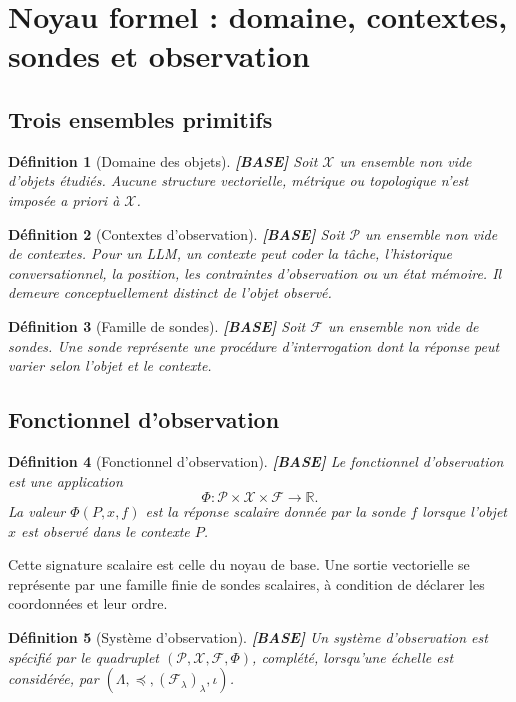 \documentclass[11pt,a4paper]{article}
\newtheorem{definition}{Définition}[section]
\theoremstyle{remark}
\newcommand{\R}{\mathbb R}
\newcommand{\X}{\mathcal X}
\newcommand{\Pctx}{\mathcal P}
\newcommand{\F}{\mathcal F}
\newcommand{\Lam}{\Lambda}
\begin{document}
\section{Noyau formel : domaine, contextes, sondes et observation}

\subsection{Trois ensembles primitifs}
\begin{definition}[Domaine des objets] \textbf{[BASE]}
Soit $\X$ un ensemble non vide d'objets étudiés. Aucune structure vectorielle, métrique ou topologique n'est imposée a priori à $\X$.
\end{definition}

\begin{definition}[Contextes d'observation] \textbf{[BASE]}
Soit $\Pctx$ un ensemble non vide de contextes. Pour un LLM, un contexte peut coder la tâche, l'historique conversationnel, la position, les contraintes d'observation ou un état mémoire. Il demeure conceptuellement distinct de l'objet observé.
\end{definition}

\begin{definition}[Famille de sondes] \textbf{[BASE]}
Soit $\F$ un ensemble non vide de sondes. Une sonde représente une procédure d'interrogation dont la réponse peut varier selon l'objet et le contexte.
\end{definition}

\subsection{Fonctionnel d'observation}
\begin{definition}[Fonctionnel d'observation] \textbf{[BASE]}
Le fonctionnel d'observation est une application
\[
\boxed{\Phi:\Pctx\times\X\times\F\longrightarrow\R.}
\]
La valeur $\Phi(P,x,f)$ est la réponse scalaire donnée par la sonde $f$ lorsque l'objet $x$ est observé dans le contexte $P$.
\end{definition}

Cette signature scalaire est celle du noyau de base. Une sortie vectorielle se représente par une famille finie de sondes scalaires, à condition de déclarer les coordonnées et leur ordre.

\begin{definition}[Système d'observation] \textbf{[BASE]}
Un système d'observation est spécifié par le quadruplet $(\Pctx,\X,\F,\Phi)$, complété, lorsqu'une échelle est considérée, par $(\Lam,\preceq, (\F_\lambda)_\lambda,\iota)$.
\end{definition}
\end{document}
